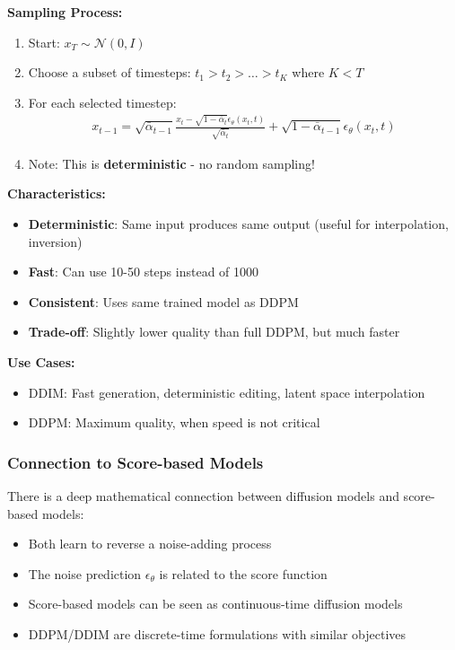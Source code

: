 \documentclass[journal]{IEEEtran}
\begin{document}
\textbf{Sampling Process:}
\begin{enumerate}
    \item Start: $x_T \sim \mathcal{N}(0, I)$
    \item Choose a subset of timesteps: $t_1 > t_2 > \ldots > t_K$ where $K < T$
    \item For each selected timestep:
    \begin{align}
        x_{t-1} = \sqrt{\bar{\alpha}_{t-1}} \frac{x_t - \sqrt{1-\bar{\alpha}_t}\epsilon_\theta(x_t, t)}{\sqrt{\bar{\alpha}_t}} + \sqrt{1-\bar{\alpha}_{t-1}} \epsilon_\theta(x_t, t)
    \end{align}
    \item Note: This is \textbf{deterministic} - no random sampling!
\end{enumerate}

\textbf{Characteristics:}
\begin{itemize}
    \item \textbf{Deterministic}: Same input produces same output (useful for interpolation, inversion)
    \item \textbf{Fast}: Can use 10-50 steps instead of 1000
    \item \textbf{Consistent}: Uses same trained model as DDPM
    \item \textbf{Trade-off}: Slightly lower quality than full DDPM, but much faster
\end{itemize}

\textbf{Use Cases:}
\begin{itemize}
    \item DDIM: Fast generation, deterministic editing, latent space interpolation
    \item DDPM: Maximum quality, when speed is not critical
\end{itemize}

\subsubsection{Connection to Score-based Models}

There is a deep mathematical connection between diffusion models and score-based models:
\begin{itemize}
    \item Both learn to reverse a noise-adding process
    \item The noise prediction $\epsilon_\theta$ is related to the score function
    \item Score-based models can be seen as continuous-time diffusion models
    \item DDPM/DDIM are discrete-time formulations with similar objectives
\end{itemize}
\end{document}
